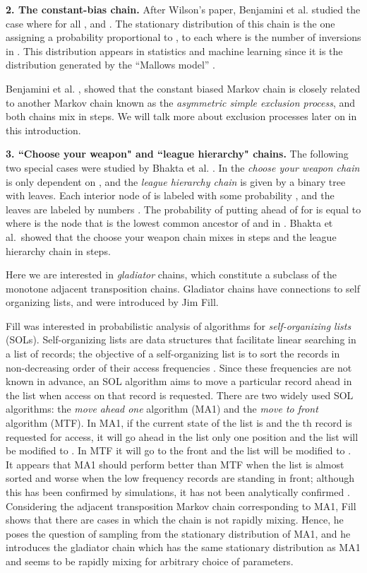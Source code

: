 \documentclass[10 pt]{article}
\begin{document}
 \smallskip
\textbf{2. The constant-bias chain.} After Wilson's paper, Benjamini et al. \cite{Benjamini} studied the case where  for all ,
and .  The stationary distribution of this chain is the one assigning a probability  proportional to ,
to each  where  is the number of inversions in . This distribution appears in statistics and machine
learning since it is the distribution generated by the ``Mallows model'' \cite{Mallow, Mallow2}.

Benjamini et al. \cite{Benjamini}, showed that the constant biased Markov chain is closely related to another Markov chain known as
the \emph{asymmetric simple exclusion process}, and both chains mix in  steps. We will talk more about exclusion processes
later on in this introduction.

 \smallskip

\textbf{3. ``Choose your weapon" and ``league hierarchy" chains.} The following two special cases were studied by Bhakta et al. \cite{Dana}.
In the \emph {choose your weapon chain}  is only dependent on , and the \emph{league hierarchy chain} is given by a binary tree
 with  leaves. Each interior node  of  is labeled with some probability , and the leaves are labeled by numbers
. The probability of putting  ahead of  for  is equal to  where  is the node that
is the lowest common ancestor of  and  in . Bhakta et al.\ showed that the choose your weapon chain mixes in 
steps and the league hierarchy chain in  steps. 
\medskip

Here we are interested in \emph{gladiator} chains, which constitute a subclass of the monotone adjacent transposition chains. Gladiator chains
have connections to self organizing lists, and were introduced by Jim Fill.
\medskip

Fill was interested in probabilistic analysis of algorithms for \emph{self-organizing lists} (SOLs). Self-organizing lists are data structures 
that facilitate linear searching in a list of records; the objective of a self-organizing list is to sort the records in non-decreasing order
of their access frequencies \cite{Self1}. Since these frequencies are not known in advance, an SOL algorithm aims to move a particular
record ahead in the list when access on that record is requested. There are two widely used SOL algorithms: the \emph{move ahead one}
algorithm (MA1) and the \emph{move to  front }algorithm (MTF). In MA1, if the current state of the list is
 and the th record is requested for access,  it will go ahead in the list only one
position and the list will be modified to .  In MTF it will go to the front and the
list will be modified to . It appears that  MA1 should perform better than MTF when the
list is almost sorted and worse when the low frequency records are standing in front; although this has been confirmed by simulations,
it has not been analytically confirmed \cite{Self2}.  Considering the adjacent transposition Markov chain corresponding to MA1, Fill shows
\cite{FillConj} that there are cases in which the chain is not rapidly mixing. Hence, he poses the question of sampling from the stationary
distribution of MA1, and he introduces the gladiator chain which has the same stationary distribution as MA1 and seems to be rapidly mixing for arbitrary
choice of parameters.
\end{document}
